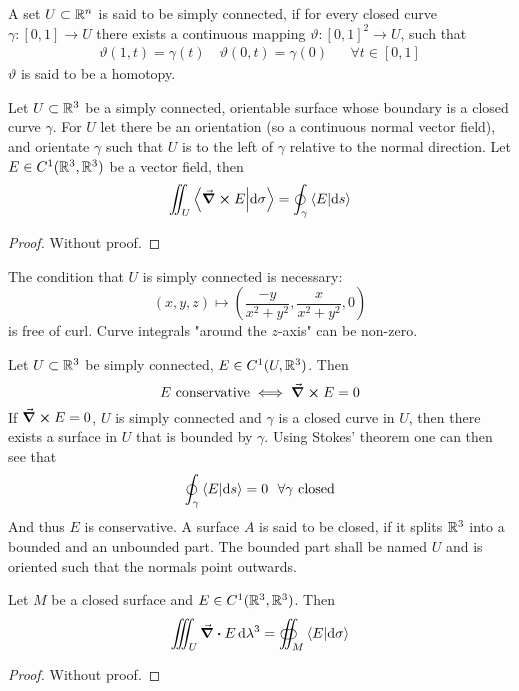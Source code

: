 \documentclass[../../script.tex]{subfiles}
\begin{document}
\begin{rem}
    A set $U \subset \mathbb{R}^n$ is said to be simply connected, if for every closed curve $\gamma: [0, 1] \rightarrow U$ there exists
    a continuous mapping $\vartheta: [0, 1]^2 \rightarrow U$, such that 
    \begin{align*}
        \vartheta(1, t) = \gamma(t) \quad \vartheta(0, t) = \gamma(0) && \forall t \in [0, 1]
    \end{align*}
    $\vartheta$ is said to be a homotopy.
\end{rem}

\begin{thm}
    Let $U \subset \mathbb{R}^3$ be a simply connected, orientable surface whose boundary is a closed curve $\gamma$. 
    For $U$ let there be an orientation (so a continuous normal vector field), 
    and orientate $\gamma$ such that $U$ is to the left of $\gamma$ relative to the normal direction.
    Let $E \in C^1(\mathbb{R}^3, \mathbb{R}^3)$ be a vector field, then 
    \[
        \iint_U \innerproduct{\curl E}{\dd{\sigma}} = \oint_{\gamma} \innerproduct{E}{\dd{s}}
    \]
\end{thm}
\begin{proof}
    Without proof.
\end{proof}

\begin{eg}
    The condition that $U$ is simply connected is necessary:
    \[
        (x, y, z) \longmapsto \left(\frac{-y}{x^2 + y^2}, \frac{x}{x^2 + y^2}, 0\right)
    \]
    is free of curl. Curve integrals "around the $z$-axis" can be non-zero.
\end{eg}

\begin{rem}
    Let $U \subset \mathbb{R}^3$ be simply connected, $E \in C^1(U, \mathbb{R}^3)$. Then 
    \[
        E \text{ conservative} \iff \curl E = 0
    \]
    If $\curl E = 0$, $U$ is simply connected and $\gamma$ is a closed curve in $U$, then there exists a surface in $U$ that is bounded by $\gamma$.
    Using Stokes' theorem one can then see that 
    \[
        \oint_{\gamma} \innerproduct{E}{\dd{s}} = 0 ~~\forall \gamma \text{ closed}
    \]  
    And thus $E$ is conservative.
    A surface $A$ is said to be closed, if it splits $\mathbb{R}^3$ into a bounded and an unbounded part. 
    The bounded part shall be named $U$ and is oriented such that the normals point outwards.
\end{rem}

\begin{thm}
    Let $M$ be a closed surface and $E \in C^1(\mathbb{R}^3, \mathbb{R}^3)$. Then 
    \[
        \iiint_U \div E \dd{\lambda^3} = \oiint_M \innerproduct{E}{\dd{\sigma}}
    \]
\end{thm}
\begin{proof}
    Without proof.
\end{proof}
\end{document}
